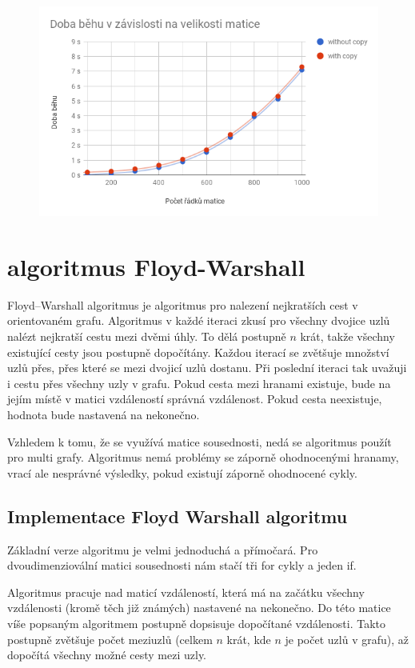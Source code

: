\documentclass[11pt, fleqn]{article}
\begin{document}
\begin{figure}
  \centering
  \includegraphics[width=.7\linewidth]{../results/cuda_dijkstra.png}
  \label{fig:d2}
\end{figure}

\section{algoritmus Floyd-Warshall}

Floyd–Warshall algoritmus je algoritmus pro nalezení nejkratších cest v orientovaném grafu. Algoritmus v každé iteraci zkusí pro všechny dvojice uzlů nalézt nejkratší cestu mezi dvěmi úhly. To dělá postupně $n$ krát, takže všechny existující cesty jsou postupně dopočítány. Každou iterací se zvětšuje množství uzlů přes, přes které se mezi dvojicí uzlů dostanu. Při poslední iteraci tak uvažuji i cestu přes všechny uzly v grafu. Pokud cesta mezi hranami existuje, bude na jejím místě v matici vzdáleností správná vzdálenost. Pokud cesta neexistuje, hodnota bude nastavená na nekonečno.

Vzhledem k tomu, že se využívá matice sousednosti, nedá se algoritmus použít pro multi grafy. Algoritmus nemá problémy se záporně ohodnocenými hranamy, vrací ale nesprávné výsledky, pokud existují záporně ohodnocené cykly.


\subsection{Implementace Floyd Warshall algoritmu}
Základní verze algoritmu je velmi jednoduchá a přímočará. Pro dvoudimenziovální matici sousednosti nám stačí tři for cykly a jeden if.

Algoritmus pracuje nad maticí vzdáleností, která má na začátku všechny vzdálenosti (kromě těch již známých) nastavené na nekonečno. Do této matice víše popsaným algoritmem postupně dopsisuje dopočítané vzdálenosti. Takto postupně zvětšuje počet meziuzlů (celkem $n$ krát, kde $n$ je počet uzlů v grafu), až dopočítá všechny možné cesty mezi uzly.
\end{document}
